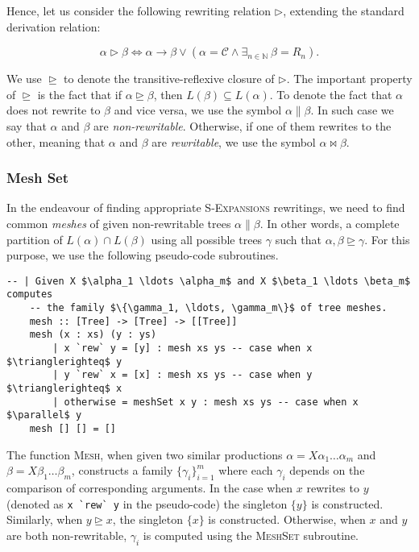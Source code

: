 \documentclass[11pt,a4paper]{amsart}
\theoremstyle{definition}
\begin{document}
Hence, let us consider the following rewriting relation $\triangleright$, extending the standard derivation relation:

\[ \alpha \triangleright \beta \Leftrightarrow \alpha \to \beta \lor \left(\alpha = \mathcal{C} \land  \exists_{n \in \mathbb{N}}~\beta = R_n \right). \]

We use $\trianglerighteq$ to denote the transitive-reflexive closure of $\triangleright$. The important property of $\trianglerighteq$ is the fact that if $\alpha \trianglerighteq \beta$, then $L(\beta) \subseteq L(\alpha)$. To denote the fact that $\alpha$ does not rewrite to $\beta$ and vice versa, we use the symbol $\alpha \parallel \beta$. In such case we say that $\alpha$ and $\beta$ are \emph{non-rewritable}. Otherwise, if one of them rewrites to the other, meaning that $\alpha$ and $\beta$ are \emph{rewritable}, we use the symbol $\alpha \bowtie \beta$.

\subsubsection{Mesh Set}
In the endeavour of finding appropriate \textsc{S-Expansions} rewritings, we need to find common \emph{meshes} of given non-rewritable trees $\alpha \parallel \beta$. In other words, a complete partition of $L(\alpha) \cap L(\beta)$ using all possible trees $\gamma$ such that $\alpha,\beta \trianglerighteq \gamma$. For this purpose, we use the following pseudo-code subroutines.

\begin{lstlisting}[mathescape=true]
    -- | Given X $\alpha_1 \ldots \alpha_m$ and X $\beta_1 \ldots \beta_m$ computes
    -- the family $\{\gamma_1, \ldots, \gamma_m\}$ of tree meshes. 
    mesh :: [Tree] -> [Tree] -> [[Tree]]
    mesh (x : xs) (y : ys)
        | x `rew` y = [y] : mesh xs ys -- case when x $\trianglerighteq$ y
        | y `rew` x = [x] : mesh xs ys -- case when y $\trianglerighteq$ x
        | otherwise = meshSet x y : mesh xs ys -- case when x $\parallel$ y
    mesh [] [] = []
\end{lstlisting}

The function \textsc{Mesh}, when given two similar productions $\alpha = X \alpha_1 \ldots \alpha_m$ and $\beta = X \beta_1 \ldots \beta_m$, constructs a family $\{\gamma_i\}_{i = 1}^{m}$ where each $\gamma_i$ depends on the comparison of corresponding arguments. In the case when $x$ rewrites to $y$ (denoted as \verb|x `rew` y| in the pseudo-code) the singleton $\{y\}$ is constructed. Similarly, when $y \trianglerighteq x$, the singleton $\{x\}$ is constructed. Otherwise, when $x$ and $y$ are both non-rewritable, $\gamma_i$ is computed using the \textsc{MeshSet} subroutine.
\end{document}
